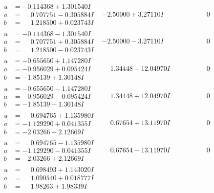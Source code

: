 \documentclass[1p]{elsarticle_modified}
\theoremstyle{definition}
\begin{document}
$$\begin{array}{c|c|c}
\begin{aligned}
u &= -0.114368 + 1.301540 I \\
a &= \phantom{-}0.707751 - 0.305884 I \\
b &= \phantom{-}1.218500 + 0.023743 I\end{aligned}
 & -2.50000 + 3.27110 I & \phantom{-0.000000 } 0 \\ \hline\begin{aligned}
u &= -0.114368 - 1.301540 I \\
a &= \phantom{-}0.707751 + 0.305884 I \\
b &= \phantom{-}1.218500 - 0.023743 I\end{aligned}
 & -2.50000 - 3.27110 I & \phantom{-0.000000 } 0 \\ \hline\begin{aligned}
u &= -0.655650 + 1.147280 I \\
a &= -0.956029 + 0.095424 I \\
b &= -1.85139 + 1.30148 I\end{aligned}
 & \phantom{-}1.34448 - 12.04970 I & \phantom{-0.000000 } 0 \\ \hline\begin{aligned}
u &= -0.655650 - 1.147280 I \\
a &= -0.956029 - 0.095424 I \\
b &= -1.85139 - 1.30148 I\end{aligned}
 & \phantom{-}1.34448 + 12.04970 I & \phantom{-0.000000 } 0 \\ \hline\begin{aligned}
u &= \phantom{-}0.694765 + 1.135980 I \\
a &= -1.129290 + 0.041355 I \\
b &= -2.03266 - 2.12669 I\end{aligned}
 & \phantom{-}0.67654 + 13.11970 I & \phantom{-0.000000 } 0 \\ \hline\begin{aligned}
u &= \phantom{-}0.694765 - 1.135980 I \\
a &= -1.129290 - 0.041355 I \\
b &= -2.03266 + 2.12669 I\end{aligned}
 & \phantom{-}0.67654 - 13.11970 I & \phantom{-0.000000 } 0 \\ \hline\begin{aligned}
u &= \phantom{-}0.698493 + 1.143020 I \\
a &= \phantom{-}1.090540 + 0.018777 I \\
b &= \phantom{-}1.98263 + 1.98339 I\end{aligned}

\end{array}$$
\end{document}
